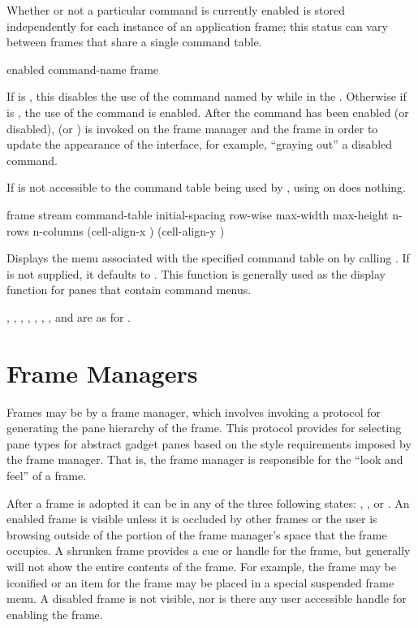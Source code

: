 {Whether or not a particular command is currently enabled is stored independently
for each instance of an application frame; this status can vary between frames
that share a single command table.

 {enabled command-name frame}

If  is , this disables the use of the command named by
 while in the  .  Otherwise if
 is , the use of the command is enabled.  After the
command has been enabled (or disabled),  (or
) is invoked on the frame manager and the frame in
order to update the appearance of the interface, for example, ``graying out'' a
disabled command.

If  is not accessible to the command table being used by
, using  on  does nothing.


 {frame stream
                                    \key command-table initial-spacing row-wise
                                         max-width max-height n-rows n-columns
                                         (cell-align-x ) (cell-align-y )}

Displays the menu associated with the specified command table on  by
calling .  If  is not
supplied, it defaults to .  This function
is generally used as the display function for panes that contain command menus.

, , , ,
, , , and  are
as for .


\section {Frame Managers}

Frames may be  by a frame manager, which involves invoking a
protocol for generating the pane hierarchy of the frame.  This protocol provides
for selecting pane types for abstract gadget panes based on the style
requirements imposed by the frame manager.  That is, the frame manager is
responsible for the ``look and feel'' of a frame.

After a frame is adopted it can be in any of the three following states:
, , or .  An enabled frame is
visible unless it is occluded by other frames or the user is browsing outside of
the portion of the frame manager's space that the frame occupies.  A shrunken
frame provides a cue or handle for the frame, but generally will not show the
entire contents of the frame.  For example, the frame may be iconified or an
item for the frame may be placed in a special suspended frame menu.  A disabled
frame is not visible, nor is there any user accessible handle for enabling the
frame.

}
